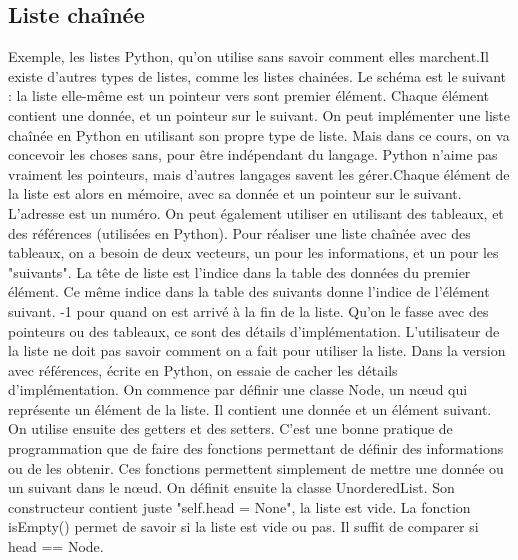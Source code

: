 \documentclass[10pt]{article}
\begin{document}
\subsection{Liste chaînée}
Exemple, les listes Python, qu'on utilise sans savoir comment elles marchent.Il existe d'autres types de listes, comme les listes chainées. Le schéma est le suivant : la liste elle-même est un pointeur vers sont premier élément. Chaque élément contient une donnée, et un pointeur sur le suivant.
\newline \newline 
On peut implémenter une liste chaînée en Python en utilisant son propre type de liste. Mais dans ce cours, on va concevoir les choses sans, pour être indépendant du langage. 
\newline \newline 
Python n'aime pas vraiment les pointeurs, mais d'autres langages savent les gérer.Chaque élément de la liste est alors en mémoire, avec sa donnée et un pointeur sur le suivant. L'adresse est un numéro. 
\newline \newline 
On peut également utiliser en utilisant des tableaux, et des références (utilisées en Python). Pour réaliser une liste chaînée avec des tableaux, on a besoin de deux vecteurs, un pour les informations, et un pour les "suivants". La tête de liste est l'indice dans la table des données du premier élément. Ce même indice dans la table des suivants donne l'indice de l'élément suivant. -1 pour quand on est arrivé à la fin de la liste.
\newline \newline 
Qu'on le fasse avec des pointeurs ou des tableaux, ce sont des détails d'implémentation. L'utilisateur de la liste ne doit pas savoir comment on a fait pour utiliser la liste. Dans la version avec références, écrite en Python, on essaie de cacher les détails d'implémentation. 
\newline \newline 
On commence par définir une classe Node, un nœud qui représente un élément de la liste.  Il contient une donnée et un élément suivant.  On utilise ensuite des getters et des setters.  C'est une bonne pratique de programmation que de faire des fonctions permettant de définir des informations ou de les obtenir.  Ces fonctions permettent simplement de mettre une donnée ou un suivant dans le nœud.
\newline \newline 
On définit ensuite la classe UnorderedList. Son constructeur contient juste "self.head = None", la liste est vide.  La fonction isEmpty() permet de savoir si la liste est vide ou pas. Il suffit de comparer si head == Node. 
\end{document}

